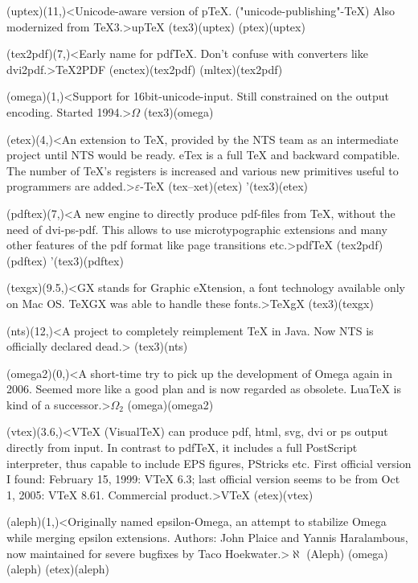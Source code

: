 \documentclass[
%
]{scrartcl}
\begin{document}
{	\tonode[\experimental](uptex)(11,\layer)<Unicode-aware version of pTeX. ("unicode-publishing"-TeX) Also modernized from TeX3.>{up\TeX}
	\todraw(tex3)(uptex)
	\todraw(ptex)(uptex)

	\steplayer[-2]
	\tonode(tex2pdf)(7,\layer)<Early name for pdfTeX. Don't confuse with converters like dvi2pdf.>{\TeX2PDF}
	\todraw(enctex)(tex2pdf)
	\todraw(mltex)(tex2pdf)
	
	\steplayer[-2]
	\tonode(omega)(1,\layer)<Support for 16bit-unicode-input. Still constrained on the output encoding. Started 1994.>{$\Omega$}
	\todraw(tex3)(omega)
	
	\tonode[\vip](etex)(4,\layer)<An extension to TeX, provided by the NTS team as an intermediate project until NTS would be ready. eTex is a full TeX and backward compatible. The number of TeX's registers is increased and various new primitives useful to programmers are added.>{$\varepsilon$-\TeX}
	\todraw(tex--xet)(etex)
	\todraw'(tex3)(etex)
	
	\tonode[\vip](pdftex)(7,\layer)<A new engine to directly produce pdf-files from TeX, without the need of dvi-ps-pdf. This allows to use microtypographic extensions and many other features of the pdf format like page transitions etc.>{pdf\TeX}
	\todraw(tex2pdf)(pdftex)
	\todraw'(tex3)(pdftex)
	
	\tonode(texgx)(9.5,\layer)<GX stands for Graphic eXtension, a font technology available only on Mac OS. TeXGX was able to handle these fonts.>{\TeX{}gX}
	\todraw(tex3)(texgx)
	
	\tonode(nts)(12,\layer)<A project to completely reimplement TeX in Java. Now NTS is officially declared dead.>{\NTS}
	\todraw(tex3)(nts)
	
	\steplayer[-2]
	\tonode[\experimental](omega2)(0,\layer)<A short-time try to pick up the development of Omega again in 2006. Seemed more like a good plan and is now regarded as obsolete. LuaTeX is kind of a successor.>{$\Omega_2$}
	\todraw(omega)(omega2)
	
	\tonode[\experimental](vtex)(3.6,\layer)<VTeX (VisualTeX) can produce pdf, html, svg, dvi or ps output directly from input. In contrast to pdfTeX, it includes a full PostScript interpreter, thus capable to include EPS figures, PStricks etc. First official version I found: February 15, 1999: VTeX 6.3; last official version seems to be from Oct 1, 2005: VTeX 8.61. Commercial product.>{V\TeX}
	\todraw(etex)(vtex)
	
	\steplayer[-2]
	\tonode[\experimental](aleph)(1,\layer)<Originally named epsilon-Omega, an attempt to stabilize Omega while merging epsilon extensions. Authors: John Plaice and Yannis Haralambous, now maintained for severe bugfixes by Taco Hoekwater.>{$\aleph$ (Aleph)}
	\todraw(omega)(aleph)
	\todraw(etex)(aleph)
	
}
\end{document}
